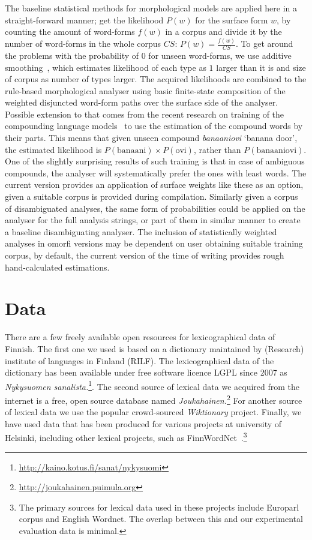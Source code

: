 \documentclass[a4paper,12pt]{article}
\begin{document}
The baseline statistical methods for morphological models are applied here in a
straight-forward manner; get the likelihood $P(w)$ for the surface form $w$, by
counting the amount of word-forms $f(w)$ in a corpus and divide it by the
number of word-forms in the whole corpus $CS$: $P(w) = \frac{f(w)}{CS}$.  To
get around the problems with the probability of $0$ for unseen word-forms, we
use additive smoothing~\citep{chen1999empirical}, which estimates likelihood of
each type as $1$ larger than it is and size of corpus as number of types
larger. The acquired likelihoods are combined to the rule-based morphological
analyser using basic finite-state composition of the weighted disjuncted
word-form paths over the surface side of the analyser. Possible extension to
that comes from the recent research on training of the compounding language
models~\citep{pirinen2009weighting} to use the estimation of the compound words
by their parts. This means that given unseen compound \emph{banaaniovi} `banana
door', the estimated likelihood is $P(\mathrm{banaani}) \times
P(\mathrm{ovi})$, rather than $P(\mathrm{banaaniovi})$. One of the slightly
surprising results of such training is that in case of ambiguous compounds, the
analyser will systematically prefer the ones with least words. The current
version provides an application of surface weights like these as an option,
given a suitable corpus is provided during compilation. Similarly given a
corpus of disambiguated analyses, the same form of probabilities could be
applied on the analyser for the full analysis strings, or part of them in
similar manner to create a baseline disambiguating analyser. The inclusion of
statistically weighted analyses in omorfi versions may be dependent on user
obtaining suitable training corpus, by default, the current version of the time
of writing provides rough hand-calculated estimations.

\section{Data}
\label{sec:data}

There are a few freely available open resources for lexicographical data of
Finnish. The first one  we used is based on a dictionary maintained by
(Research) institute of languages in Finland (RILF). The lexicographical data
of the dictionary has been available under free software licence LGPL since
2007 as \emph{Nykysuomen
sanalista.}\footnote{\url{http://kaino.kotus.fi/sanat/nykysuomi}}.  The second
source of lexical data we acquired from the internet is a free, open source
database named
\emph{Joukahainen.}\footnote{\url{http://joukahainen.puimula.org}}  For another
source of lexical data we use the popular crowd-sourced \emph{Wiktionary}
project.  Finally, we have used data that has been produced for various
projects at university of Helsinki, including other lexical projects, such as
FinnWordNet~\citep{linden2010finnwordnet}.\footnote{The primary sources for
lexical data used in these projects include Europarl corpus and English
Wordnet.  The overlap between this and our experimental evaluation data is
minimal.} 
\end{document}
